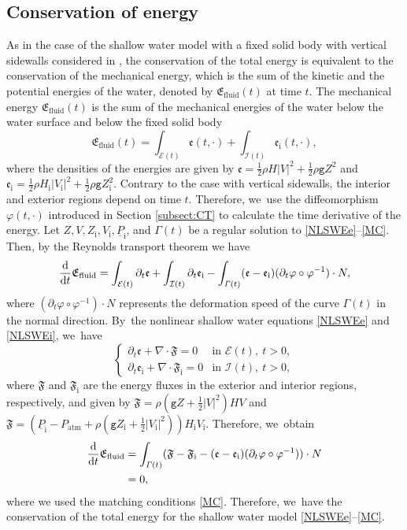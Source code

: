\documentclass[10pt]{amsart}
\newcommand{\gr}{{\mathtt g}}
\newcommand{\dt}{\partial_t}
\newcommand{\cI}{{\mathcal I}}
\newcommand{\cE}{{\mathcal E}}
\newcommand{\ul}[1]{\underline{#1}}
\newcommand{\itGamma}{\mathit{\Gamma}}
\theoremstyle{definition}
\begin{document}
\subsection{Conservation of energy}\label{sectconsNRJ}
As in the case of the shallow water model with a fixed solid body with vertical sidewalls considered in \cite{IguchiLannes2023},
the conservation of the total energy is equivalent to the conservation of the mechanical energy,
which is the sum of the kinetic and the potential energies of the water, denoted by $\mathfrak{E}_\mathrm{fluid}(t)$ at time $t$.
The mechanical energy $\mathfrak{E}_\mathrm{fluid}(t)$ is the sum of the mechanical energies of the water below the water surface and below the fixed solid body
\[
\mathfrak{E}_\mathrm{fluid}(t) = \int_{\cE(t)}\mathfrak{e}(t,\cdot) + \int_{\cI(t)}\mathfrak{e}_\mathrm{i}(t,\cdot),
\]
where the densities of the energies are given by $\mathfrak{e} = \frac12\rho H|V|^2 + \frac12\rho\gr Z^2$
and $\mathfrak{e}_\mathrm{i} = \frac12\rho H_\mathrm{i}|V_\mathrm{i}|^2+\frac12\rho\gr Z_\mathrm{i}^2$.
Contrary to the case with vertical sidewalls, the interior and exterior regions depend on time $t$.
Therefore, we~use the diffeomorphism $\varphi(t,\cdot)$ introduced in Section \ref{subsect:CT} to calculate the time derivative of the energy.
Let $Z,V,Z_\mathrm{i},V_\mathrm{i},\ul{P}_\mathrm{i}$, and $\itGamma(t)$ be a regular solution to \eqref{NLSWEe}--\eqref{MC}.
Then, by the Reynolds transport theorem we have
\[
\frac{\rm d}{{\rm d}t}\mathfrak{E}_\mathrm{fluid}
= \int_{\cE(t)}\dt\mathfrak{e} + \int_{\cI(t)}\dt\mathfrak{e}_\mathrm{i} - \int_{\itGamma(t)}(\mathfrak{e}-\mathfrak{e}_\mathrm{i})(\dt\varphi\circ\varphi^{-1})\cdot N,
\]
where $(\dt\varphi\circ\varphi^{-1})\cdot N$ represents the deformation speed of the curve $\itGamma(t)$ in the normal direction. By~the nonlinear shallow water equations \eqref{NLSWEe} and \eqref{NLSWEi}, we~have
\[
\begin{cases}
\dt\mathfrak{e} + \nabla\cdot\mathfrak{F} = 0 &\text{in } \cE(t), \ t>0, \\
\dt\mathfrak{e}_\mathrm{i} + \nabla\cdot\mathfrak{F}_\mathrm{i} = 0 &\text{in } \cI(t), \ t>0,
\end{cases}
\]
where $\mathfrak{F}$ and $\mathfrak{F}_\mathrm{i}$ are the energy fluxes in the exterior and interior regions, respectively, and given by
$\mathfrak{F}=\rho(\gr Z+\frac12|V|^2)HV$ and $\mathfrak{F}=(\ul{P}_\mathrm{i}-P_\mathrm{atm}+\rho(\gr Z_\mathrm{i}+\frac12|V_\mathrm{i}|^2))H_\mathrm{i}V_\mathrm{i}$.
Therefore, we~obtain
\begin{align*}
\frac{\rm d}{{\rm d}t}\mathfrak{E}_\mathrm{fluid}
&= \int_{\itGamma(t)}(\mathfrak{F}-\mathfrak{F}_\mathrm{i}-(\mathfrak{e}-\mathfrak{e}_\mathrm{i})(\dt\varphi\circ\varphi^{-1}))\cdot N \\
&= 0,
\end{align*}
where we used the matching conditions \eqref{MC}.
Therefore, we~have the conservation of the total energy for the shallow water model \eqref{NLSWEe}--\eqref{MC}.
\end{document}
